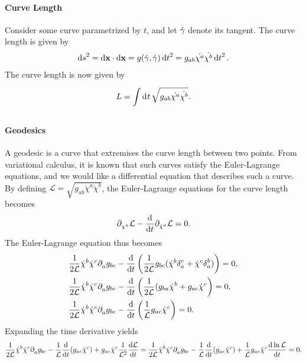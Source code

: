 \paragraph{Curve Length}
Consider some curve parametrized by $t$, and let $\dot{\vb{\gamma}}$ denote its tangent. The curve length is given by
\begin{align*}
	\dd{s}^{2} = \dd{\vb{x}}\cdot\dd{\vb{x}} = g(\dot{\vb{\gamma}}, \dot{\vb{\gamma}})\dd{t}^{2} = g_{ab}\dot{\chi^{a}}\dot{\chi^{b}}\dd{t}^{2}.
\end{align*}
The curve length is now given by
\begin{align*}
	L = \int\limits_{}^{}\dd[]{t}\sqrt{g_{ab}\dot{\chi^{a}}\dot{\chi^{b}}}.
\end{align*}

\paragraph{Geodesics}
A geodesic is a curve that extremises the curve length between two points. From variational calculus, it is known that such curves satisfy the Euler-Lagrange equations, and we would like a differential equation that describes such a curve. By defining $\mathcal{L} = \sqrt{g_{ab}\dot{\chi}^{a}\dot{\chi}^{b}}$, the Euler-Lagrange equations for the curve length becomes
\begin{align*}
	\partial^{}_{\chi^{a}}\mathcal{L} - \dv{t}\partial^{}_{\dot{\chi}^{a}}\mathcal{L} = 0.
\end{align*}
The Euler-Lagrange equation thus becomes
\begin{align*}
	&\frac{1}{2\mathcal{L}}\dot{\chi}^{b}\dot{\chi}^{c}\del{a}{g_{bc}} - \dv{t}\left(\frac{1}{2\mathcal{L}}g_{bc}(\dot{\chi}^{b}\kdelta{a}{c} + \dot{\chi}^{c}\kdelta{a}{b})\right) = 0, \\
	&\frac{1}{2\mathcal{L}}\dot{\chi}^{b}\dot{\chi}^{c}\del{a}{g_{bc}} - \dv{t}\left(\frac{1}{2\mathcal{L}}(g_{ba}\dot{\chi}^{b} + g_{ac}\dot{\chi}^{c}\right) = 0, \\
	&\frac{1}{2\mathcal{L}}\dot{\chi}^{b}\dot{\chi}^{c}\del{a}{g_{bc}} - \dv{t}\left(\frac{1}{\mathcal{L}}g_{ac}\dot{\chi}^{c}\right) = 0.
\end{align*}
Expanding the time derivative yields
\begin{align*}
	\frac{1}{2\mathcal{L}}\dot{\chi}^{b}\dot{\chi}^{c}\partial^{}_{a}g_{bc} - \frac{1}{\mathcal{L}}\dv{t}(g_{ac}\dot{\chi}^{c}) + g_{ac}\dot{\chi}^{c}\frac{1}{\mathcal{L}^{2}}\dv{\ensuremath{\mathcal{L}}}{t} = \frac{1}{2\mathcal{L}}\dot{\chi}^{b}\dot{\chi}^{c}\partial^{}_{a}g_{bc} - \frac{1}{\mathcal{L}}\dv{t}(g_{ac}\dot{\chi}^{c}) + \frac{1}{\mathcal{L}}g_{ac}\dot{\chi}^{c}\dv{\ln{\ensuremath{\mathcal{L}}}}{t} = 0.
\end{align*}
